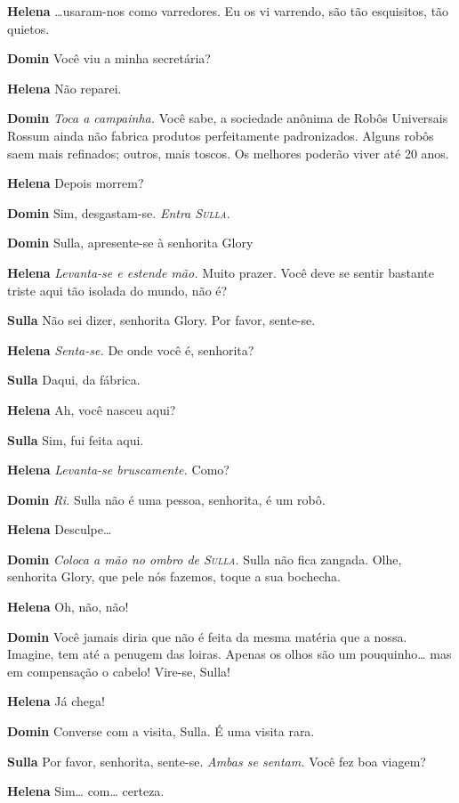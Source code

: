 \textbf{Helena} \ldots{}usaram-nos como varredores. Eu os vi varrendo, são tão esquisitos,
tão quietos.

\textbf{Domin} Você viu a minha secretária?

\textbf{Helena} Não reparei.

\textbf{Domin} \emph{Toca a campainha.} Você sabe, a sociedade anônima de Robôs
Universais Rossum ainda não fabrica produtos perfeitamente padronizados. Alguns robôs saem mais
refinados; outros, mais toscos. Os melhores poderão viver até 20 anos.

\textbf{Helena} Depois morrem?

\textbf{Domin} Sim, desgastam-se.
\emph{Entra \textsc{Sulla}.}

\textbf{Domin} Sulla, apresente-se à senhorita Glory

\textbf{Helena} \emph{Levanta-se e estende mão.} Muito prazer. Você deve se sentir
bastante triste aqui tão isolada do mundo, não é?

\textbf{Sulla} Não sei dizer, senhorita Glory. Por favor, sente-se.

\textbf{Helena} \emph{Senta-se.} De onde você é, senhorita?

\textbf{Sulla} Daqui, da fábrica.

\textbf{Helena} Ah, você nasceu aqui?

\textbf{Sulla} Sim, fui feita aqui.

\textbf{Helena} \emph{Levanta-se bruscamente.} Como?

\textbf{Domin} \emph{Ri.} Sulla não é uma pessoa, senhorita, é um robô.

\textbf{Helena} Desculpe\ldots{}

\textbf{Domin} \emph{Coloca a mão no ombro de \textsc{Sulla}.} Sulla não fica zangada. Olhe,
senhorita Glory, que pele nós fazemos, toque a sua bochecha.

\textbf{Helena} Oh, não, não!

\textbf{Domin} Você jamais diria que não é feita da mesma matéria que a nossa.
Imagine, tem até a penugem das loiras. Apenas os olhos são um pouquinho\ldots{} mas em compensação
o cabelo! Vire-se, Sulla!

\textbf{Helena} Já chega!

\textbf{Domin} Converse com a visita, Sulla. É uma visita rara.

\textbf{Sulla} Por favor, senhorita, sente-se. \emph{Ambas se sentam.} Você fez 
boa viagem?

\textbf{Helena} Sim\ldots{} com\ldots{} certeza.

